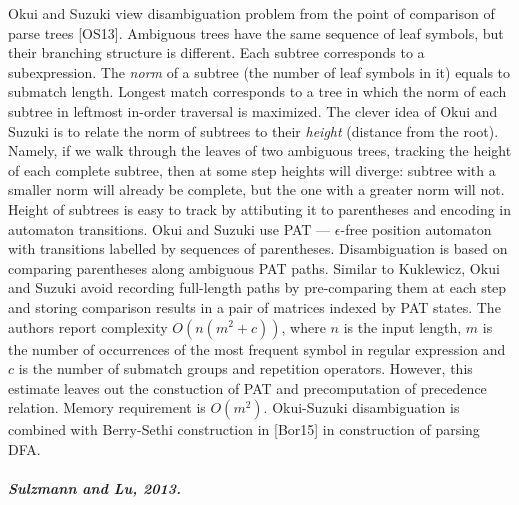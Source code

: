 \documentclass[AMA,STIX1COL]{WileyNJD-v2}
\begin{document}
Okui and Suzuki view disambiguation problem from the point of comparison of parse trees [OS13].
Ambiguous trees have the same sequence of leaf symbols, but their branching structure is different.
Each subtree corresponds to a subexpression.
The \emph{norm} of a subtree (the number of leaf symbols in it) equals to submatch length.
Longest match corresponds to a tree in which the norm of each subtree in leftmost in-order traversal is maximized.
The clever idea of Okui and Suzuki is to relate the norm of subtrees to their \emph{height} (distance from the root).
Namely, if we walk through the leaves of two ambiguous trees, tracking the height of each complete subtree,
then at some step heights will diverge:
subtree with a smaller norm will already be complete, but the one with a greater norm will not.
Height of subtrees is easy to track by attibuting it to parentheses and encoding in automaton transitions.
Okui and Suzuki use PAT --- $\epsilon$-free position automaton with transitions labelled by sequences of parentheses.
Disambiguation is based on comparing parentheses along ambiguous PAT paths.
Similar to Kuklewicz, Okui and Suzuki avoid recording full-length paths
by pre-comparing them at each step and storing comparison results in a pair of matrices indexed by PAT states.
The authors report complexity $O(n(m^2 + c))$, where
$n$ is the input length,
$m$ is the number of occurrences of the most frequent symbol in regular expression
and $c$ is the number of submatch groups and repetition operators.
However, this estimate leaves out the constuction of PAT and precomputation of precedence relation.
Memory requirement is $O(m^2)$.
Okui-Suzuki disambiguation is combined with Berry-Sethi construction in [Bor15] in construction of parsing DFA.

\subparagraph{Sulzmann and Lu, 2013.}
\end{document}
